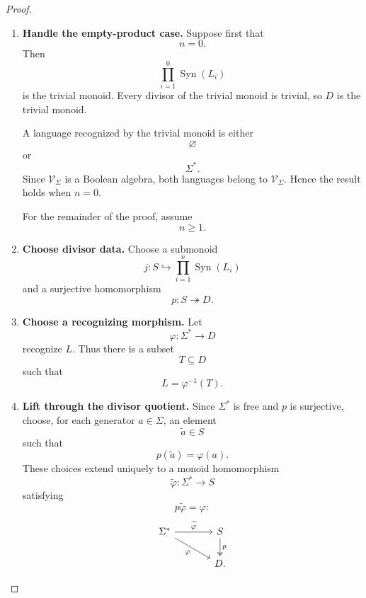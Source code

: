 \begin{proof}
    \leavevmode
    \begin{enumerate}
        \item \textbf{Handle the empty-product case.}
        Suppose first that
        \[
            n=0.
        \]
        Then
        \[
            \prod_{i=1}^0\operatorname{Syn}(L_i)
        \]
        is the trivial monoid. Every divisor of the trivial monoid is
        trivial, so \(D\) is the trivial monoid.

        A language recognized by the trivial monoid is either
        \[
            \varnothing
        \]
        or
        \[
            \Sigma^*.
        \]
        Since \(\mathcal V_\Sigma\) is a Boolean algebra, both languages
        belong to \(\mathcal V_\Sigma\). Hence the result holds when \(n=0\).

        For the remainder of the proof, assume
        \[
            n\geq1.
        \]

        \item \textbf{Choose divisor data.}
        Choose a submonoid
        \[
            j:S\hookrightarrow
            \prod_{i=1}^n\operatorname{Syn}(L_i)
        \]
        and a surjective homomorphism
        \[
            p:S\twoheadrightarrow D.
        \]

        \item \textbf{Choose a recognizing morphism.}
        Let
        \[
            \varphi:\Sigma^*\to D
        \]
        recognize \(L\). Thus there is a subset
        \[
            T\subseteq D
        \]
        such that
        \[
            L=\varphi^{-1}(T).
        \]

        \item \textbf{Lift through the divisor quotient.}
        Since \(\Sigma^*\) is free and \(p\) is surjective, choose, for each
        generator \(a\in\Sigma\), an element
        \[
            \widetilde a\in S
        \]
        such that
        \[
            p(\widetilde a)=\varphi(a).
        \]
        These choices extend uniquely to a monoid homomorphism
        \[
            \widetilde\varphi:\Sigma^*\to S
        \]
        satisfying
        \[
            p\widetilde\varphi=\varphi:
        \]
        \[
        \begin{tikzcd}[column sep=large]
            \Sigma^*
                \arrow[r, "\widetilde\varphi"]
                \arrow[dr, "\varphi"']
            &
            S
                \arrow[d, two heads, "p"]
            \\
            &
            D.
        \end{tikzcd}
        \]


\end{enumerate}
\end{proof}
